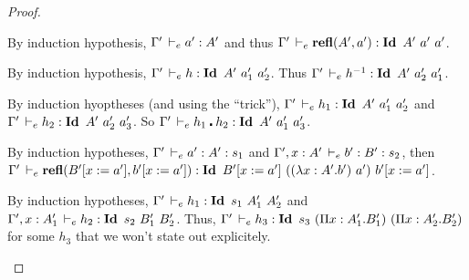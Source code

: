 \documentclass[a4paper,english]{lipics-utf8x}
\begin{document}
\begin{proof}
\begin{caselist}
      \begin{graycase}
        \begin{mathc}
        \end{mathc}
        By induction hypothesis, $\Gamma' \,\vdash_e a' : A'$ and thus
        $\Gamma' \,\vdash_e \operatorname{\mathbf{refl}}(A',a') : \operatorname{\mathbf{Id}~} A'\ a'\ a'$.
      \end{graycase}

      \begin{graycase}
        \begin{mathc}
        \end{mathc}
        By induction hypothesis, $\Gamma' \,\vdash_e h : \operatorname{\mathbf{Id}~} A'\ a'_1\ a'_2$.
        Thus $\Gamma' \,\vdash_e h^{-1} : \operatorname{\mathbf{Id}~} A'\ a'_2\ a'_1$.
      \end{graycase}

      \begin{graycase}
        \begin{mathc}
        \end{mathc}
        By induction hyoptheses (and using the ``trick''),
        $\Gamma' \,\vdash_e h_1 : \operatorname{\mathbf{Id}~} A'\ a'_1\ a'_2$ and
        $\Gamma' \,\vdash_e h_2 : \operatorname{\mathbf{Id}~} A'\ a'_2\ a'_3$.
        So $\Gamma' \,\vdash_e h_1 \centerdot h_2 : \operatorname{\mathbf{Id}~} A'\ a'_1\ a'_3$.
      \end{graycase}

      \begin{graycase}
        \begin{mathc}
        \end{mathc}
        By induction hypotheses, $\Gamma' \,\vdash_e a' : A' : s_1$ and
        $\Gamma', x:A' \,\vdash_e b' : B' : s_2$, then
        $\Gamma' \dere \refl(B'[x := a'], b'[x := a']) : \Id B'[x := a']\ %
        ((\lambda x:A'.b')\ a')\ b'[x := a']$.
      \end{graycase}

      \begin{graycase}
        \begin{mathc}
        \end{mathc}
        By induction hypotheses, $\Gamma' \,\vdash_e h_1 : \operatorname{\mathbf{Id}~} s_1\ A'_1\ A'_2$
        and $\Gamma', x:A'_1 \,\vdash_e h_2 : \operatorname{\mathbf{Id}~} s_2\ B'_1\ B'_2$.
        Thus,
        $\Gamma' \,\vdash_e h_3 : \operatorname{\mathbf{Id}~} s_3\ (\Pi x:A'_1.B'_1)\ (\Pi x:A'_2.B'_2)$
        for some $h_3$ that we won't state out explicitely.
      \end{graycase}


\end{caselist}
\end{proof}
\end{document}
